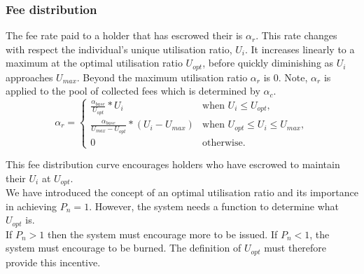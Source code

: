\newpage
\subsubsection{Fee distribution}

\noindent The fee rate paid to a \HAV{} holder that has escrowed their \HAV{} is $\alpha_r$. This rate changes with respect the individual's unique utilisation ratio, $U_i$. It increases linearly to a maximum at the optimal utilisation ratio $U_{opt}$, before quickly diminishing as $U_i$ approaches $U_{max}$. Beyond the maximum utilisation ratio $\alpha_r$ is 0. Note, $\alpha_r$ is applied to the pool of collected fees which is determined by $\alpha_c$. \\

\[
\alpha_r = 
\begin{cases}
 \frac{\alpha_{base}}{U_{opt}} * U_i &\mbox{when } U_i \leq U_{opt}, \\[1em]
 \frac{\alpha_{base}}{U_{max} - U_{opt}} * (U_i  - U_{max}) &\mbox{when } U_{opt} \leq U_i \leq U_{max}, \\[1em]
 0 &\mbox{otherwise}.
 \end{cases}
\]

\begin{center}
\end{center}

\noindent This fee distribution curve encourages \HAV{} holders who have escrowed to maintain their $U_i$ at $U_{opt}$.  \\

\noindent We have introduced the concept of an optimal utilisation ratio and its importance in achieving $P_n = 1$. However, the system needs a function to determine what $U_{opt}$ is. \\

\noindent If $P_n > 1$ then the system must encourage more \NOM{} to be issued. If $P_n < 1$, the system must encourage \NOM{} to be burned. The definition of $U_{opt}$ must therefore provide this incentive.

